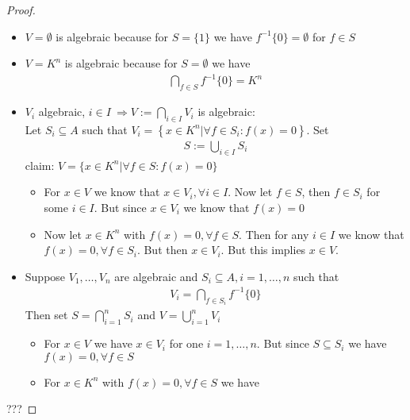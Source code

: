 \documentclass[]{article}
\begin{document}
\begin{proof}
    \begin{itemize}
        \item \(V=\emptyset\) is algebraic because for \(S=\{1\}\) we have \(f^{-1}\{0\} = \emptyset\) for \(f \in S\)
        \item \(V=K^n\) is algebraic because for \(S= \emptyset\) we have 
        \begin{align*}
            \bigcap_{f \in S} f^{-1}\{0\} = K^n
        \end{align*}
        \item \(V_i\) algebraic, \(i \in I \ \Rightarrow V:= \bigcap_{i \in I} V_i\) is algebraic: \\
        Let \(S_i \subseteq A\) such that \(V_i = \left\{ x \in K^n | \forall f \in S_i: f(x)=0 \right\}\). Set
        \begin{align*}
            S:= \bigcup_{i \in I} S_i
        \end{align*}
        claim: \(V = \{x \in K^n | \forall f \in S: f(x)=0\}\)
        \begin{itemize}
            \item For \(x \in V\) we know that \(x \in V_i, \forall i \in I\). Now let \(f \in S\), then \(f \in S_i\) for some \(i \in I\).
            But since \(x \in V_i\) we know that \(f(x) = 0\)
            \item Now let \(x \in K^n\) with \(f(x) = 0, \forall f \in S\). Then for any \(i \in I\) we know that \(f(x) = 0, \forall f \in S_i\).
            But then \(x \in V_i\). But this implies \(x \in V\).
        \end{itemize}
        \item Suppose \(V_1, \dots , V_n\) are algebraic and \(S_i \subseteq A, i = 1, \dots, n\) such that 
        \begin{align*}
            V_i = \bigcap_{f \in S_i} f^{-1}\{0\}
        \end{align*}
        Then set \(S = \bigcap_{i = 1}^n S_i\) and \(V = \bigcup_{i = 1}^n V_i\)
        \begin{itemize}
            \item For \(x \in V\) we have \(x \in V_i\) for one \(i = 1, \dots , n\). But since \(S \subseteq S_i\) we have \(f(x) = 0, \forall f \in S\)
            \item For \(x \in K^n\) with \(f(x) = 0, \forall f \in S\) we have 
        \end{itemize}
    \end{itemize}
    ???
\end{proof}
\end{document}
